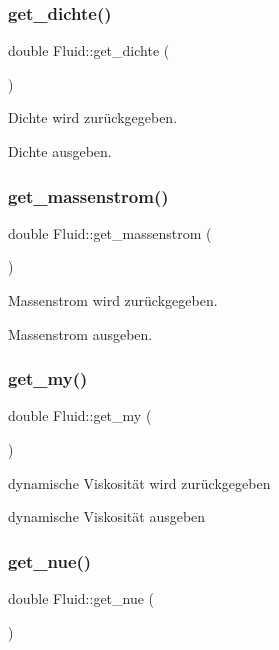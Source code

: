 \subsubsection{\texorpdfstring{get\+\_\+dichte()}{get\_dichte()}}
{\footnotesize\ttfamily double Fluid\+::get\+\_\+dichte (\begin{DoxyParamCaption}{ }\end{DoxyParamCaption})}



Dichte wird zurückgegeben. 

Dichte ausgeben. \mbox{\label{class_fluid_afd9451c48ea66d15fdb8226da58da28e}} 
\subsubsection{\texorpdfstring{get\+\_\+massenstrom()}{get\_massenstrom()}}
{\footnotesize\ttfamily double Fluid\+::get\+\_\+massenstrom (\begin{DoxyParamCaption}{ }\end{DoxyParamCaption})}



Massenstrom wird zurückgegeben. 

Massenstrom ausgeben. \mbox{\label{class_fluid_a80d39a71b73f5ac4cffcaceb61b9e0ee}} 
\subsubsection{\texorpdfstring{get\+\_\+my()}{get\_my()}}
{\footnotesize\ttfamily double Fluid\+::get\+\_\+my (\begin{DoxyParamCaption}{ }\end{DoxyParamCaption})}



dynamische Viskosität wird zurückgegeben 

dynamische Viskosität ausgeben \mbox{\label{class_fluid_ae0031c0e8f70a4fb3dacc34c9725c3c1}} 
\subsubsection{\texorpdfstring{get\+\_\+nue()}{get\_nue()}}
{\footnotesize\ttfamily double Fluid\+::get\+\_\+nue (\begin{DoxyParamCaption}{ }\end{DoxyParamCaption})}



